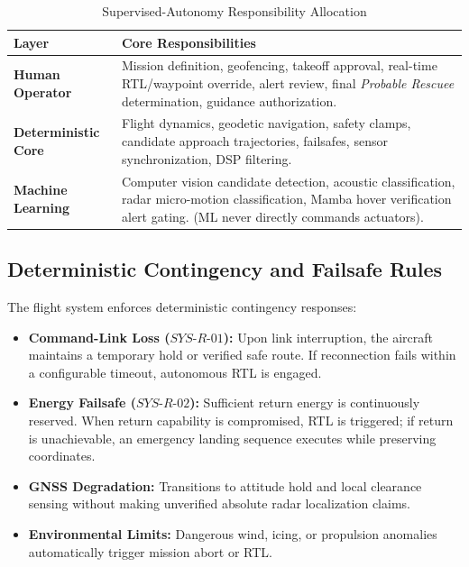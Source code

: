 \begin{table}[t]
\caption{Supervised-Autonomy Responsibility Allocation}
\label{tab:responsibility_allocation}
\centering
\footnotesize
\begin{tabularx}{\columnwidth}{@{}lX@{}}
\toprule
\textbf{Layer} & \textbf{Core Responsibilities} \\
\midrule
\textbf{Human Operator} & Mission definition, geofencing, takeoff approval, real-time RTL/waypoint override, alert review, final \emph{Probable Rescuee} determination, guidance authorization. \\
\midrule
\textbf{Deterministic Core} & Flight dynamics, geodetic navigation, safety clamps, candidate approach trajectories, failsafes, sensor synchronization, DSP filtering. \\
\midrule
\textbf{Machine Learning} & Computer vision candidate detection, acoustic classification, radar micro-motion classification, Mamba hover verification alert gating. (ML never directly commands actuators). \\
\bottomrule
\end{tabularx}
\end{table}

\subsection{Deterministic Contingency and Failsafe Rules}
The flight system enforces deterministic contingency responses:
\begin{itemize}
    \item \textbf{Command-Link Loss ($SYS\text{-}R\text{-}01$):} Upon link interruption, the aircraft maintains a temporary hold or verified safe route. If reconnection fails within a configurable timeout, autonomous RTL is engaged.
    \item \textbf{Energy Failsafe ($SYS\text{-}R\text{-}02$):} Sufficient return energy is continuously reserved. When return capability is compromised, RTL is triggered; if return is unachievable, an emergency landing sequence executes while preserving coordinates.
    \item \textbf{GNSS Degradation:} Transitions to attitude hold and local clearance sensing without making unverified absolute radar localization claims.
    \item \textbf{Environmental Limits:} Dangerous wind, icing, or propulsion anomalies automatically trigger mission abort or RTL.
\end{itemize}
